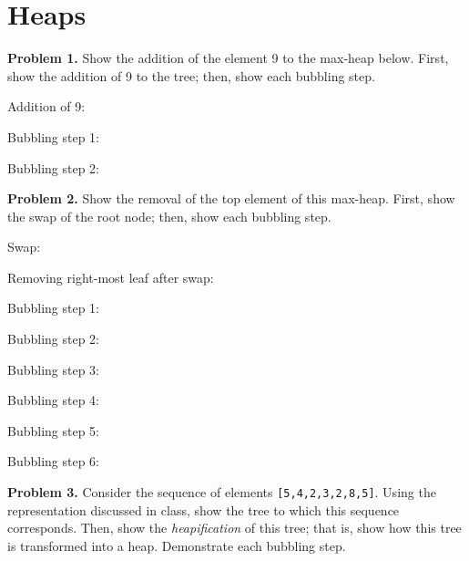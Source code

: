 \documentclass{article}
\begin{document}
\section{Heaps}

\noindent \textbf{Problem 1.} Show the addition of the element 9 to the max-heap below.  First, show the addition of 9 to the tree; then, show each bubbling step.



Addition of 9:

Bubbling step 1:

Bubbling step 2:


\noindent \textbf{Problem 2.} Show the removal of the top element of this max-heap.  First, show the swap of the root node; then, show each bubbling step.


Swap:

Removing right-most leaf after swap:

Bubbling step 1:

Bubbling step 2:


Bubbling step 3:


Bubbling step 4:


Bubbling step 5:


Bubbling step 6:




\noindent \textbf{Problem 3.} Consider the sequence of elements \texttt{[5,4,2,3,2,8,5]}.  Using the representation discussed in class, show the tree to which this sequence corresponds.  Then, show the \textit{heapification} of this tree; that is, show how this tree is transformed into a heap.  Demonstrate each bubbling step.


\end{document}
